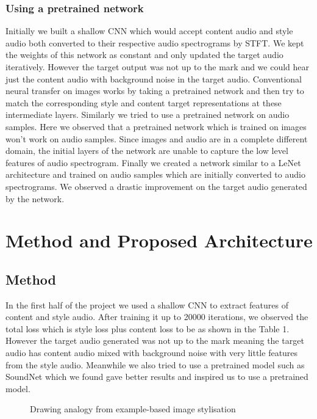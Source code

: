 \documentclass[10pt,twocolumn,letterpaper]{article}
\begin{document}
\subsubsection{Using a pretrained network}
Initially we built a shallow CNN which would accept content audio and style audio both converted to their respective audio spectrograms by STFT. We kept the weights of this network as constant and only updated the target audio iteratively. However the target output was not up to the mark and we could hear just the content audio with background noise in the target audio. Conventional neural transfer on images works by taking a pretrained network and then try to match the corresponding style and content target representations at these intermediate layers. Similarly we tried to use a pretrained network on audio samples. Here we observed that a pretrained network which is trained on images won't work on audio samples. Since images and audio are in a complete different domain, the initial layers of the network are unable to capture the low level features of audio spectrogram. Finally we created a network similar to a LeNet architecture and trained on audio samples which are initially converted to audio spectrograms. We observed a drastic improvement on the target audio generated by the network.



\section{Method and Proposed Architecture}
\subsection{Method}
In the first half of the project we used a shallow CNN to extract features of content and style audio. After training it up to 20000 iterations, we observed the total loss which is style loss plus content loss to be as shown in the Table 1. However the target audio generated was not up to the mark meaning the target audio has content audio mixed with background noise with very little features from the style audio. Meanwhile we also tried to use a pretrained model such as SoundNet which we found gave better results and inspired us to use a pretrained model.



\begin{figure}
\begin{center}
\end{center}
   \caption{Drawing analogy from example-based image stylisation}
\label{fig:short}
\end{figure}
\end{document}

